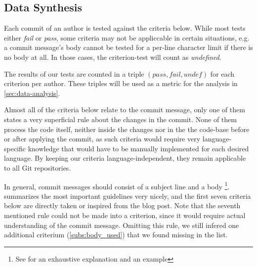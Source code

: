 \subsection{Data Synthesis}
\label{sec:data-synthesis}

%
%
%
%
%
%


Each commit of an author is tested against the criteria below. While most tests either \emph{fail} or \emph{pass}, some criteria may not be appliccable in certain situations, e.g. a commit message's body cannot be tested for a per-line character limit if there is no body at all. In those cases, the criterion-test will count as \emph{undefined}.

The results of our tests are counted in a triple $(pass, fail, undef)$ for each criterion per author. These triples will be used as a metric for the analysis in \ref{sec:data-analysis}.

Almost all of the criteria below relate to the commit message, only one of them states a very superficial rule about the changes in the commit. None of them process the code itself, neither inside the changes nor in the the code-base before or after applying the commit, as such criteria would require very language-specific knowledge that would have to be manually implemented for each desired language. By keeping our criteria language-independent, they remain applicable to all Git repositories.

In general, commit messages should consist of a subject line and a body \footnote{See \cite{OffGuide} for an exhaustive explanation and an example}. \cite{CB} summarizes the most important guidelines very nicely, and the first seven criteria below are directly taken or inspired from the blog post. Note that the seventh mentioned rule could not be made into a criterion, since it would require actual understanding of the commit message. Omitting this rule, we still infered one additional criterium (\ref{subs:body_used}) that we found missing in the list.

